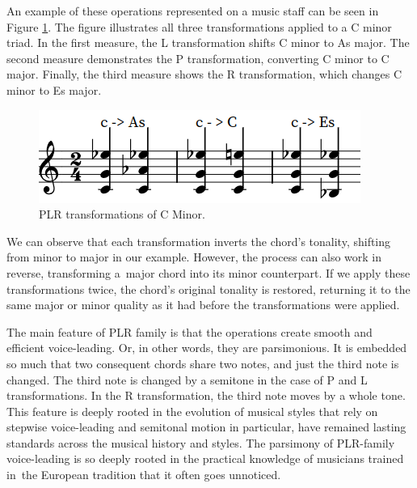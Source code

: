 An example of these operations represented on a music staff can be seen in Figure \ref{fig:cminorneoriemann}. The figure illustrates all three transformations applied to a C minor triad. In the first measure, the L transformation shifts C minor to As major. The second measure demonstrates the P transformation, converting C minor to C major. Finally, the third measure shows the R transformation, which changes C minor to Es major.

\begin{figure}[H]
    \centering
    \includegraphics[scale=0.6]{obrazky-figures/Neoriemann.png}
    \caption{PLR transformations of C Minor.}
    \label{fig:cminorneoriemann}
\end{figure}

We can observe that each transformation inverts the chord's tonality, shifting from minor to major in our example. However, the process can also work in reverse, transforming a~major chord into its minor counterpart. If we apply these transformations twice, the chord's original tonality is restored, returning it to the same major or minor quality as it had before the transformations were applied.

The main feature of PLR family is that the operations create smooth and efficient voice-leading. Or, in other words, they are parsimonious. It is embedded so much that two consequent chords share two notes, and just the third note is changed. The third note is changed by a semitone in the case of P and L transformations. In the R transformation, the third note moves by a whole tone. This feature is deeply rooted in the evolution of musical styles that rely on stepwise voice-leading and semitonal motion in particular, have remained lasting standards across the musical history and styles. The parsimony of PLR-family voice-leading is so deeply rooted in the practical knowledge of musicians trained in~the European tradition that it often goes unnoticed.

